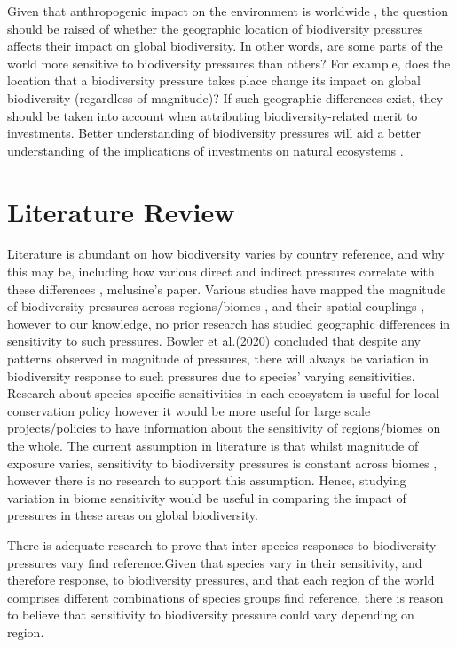\documentclass[11pt, a4paper, titlepage]{article}
\begin{document}
   	 Given that anthropogenic impact on the environment is worldwide \cite{plumptre2021might}, the question should be raised of whether the geographic location of biodiversity pressures affects their impact on global biodiversity. In other words, are some parts of the world more sensitive to biodiversity pressures than others? For example, does the location that a biodiversity pressure takes place change its impact on global biodiversity (regardless of magnitude)? If such geographic differences exist, they should be taken into account when attributing biodiversity-related merit to investments. Better understanding of biodiversity pressures will aid a better understanding of the implications of investments on natural ecosystems . \newline
   	
   	\newpage
   	\section*{Literature Review}
   	Literature is abundant on how biodiversity varies by country {reference}, and why this may be, including how various direct and indirect pressures correlate with these differences \cite{sunday2015species}, \cite{ament2019compatibility} {melusine's paper}. 
	Various studies have mapped the magnitude of biodiversity pressures across regions/biomes \newline \cite{millennium2005ecosystems} \cite{sala2000global}, and their spatial couplings \cite{bowler2020mapping}, however to our knowledge, no prior research has studied geographic differences in sensitivity to such pressures. Bowler et al.(2020) concluded that despite any patterns observed in magnitude of pressures, there will always be variation in biodiversity response to such pressures due to species' varying sensitivities. Research about species-specific sensitivities in each ecosystem is useful for local conservation policy however it would be more useful for large scale projects/policies to have information about the sensitivity of regions/biomes on the whole. The current assumption in literature is that whilst magnitude of exposure varies, sensitivity to biodiversity pressures is constant across biomes \cite{sala2000global}, however there is no research to support this assumption. Hence, studying variation in biome sensitivity would be useful in comparing the impact of pressures in these areas on global biodiversity.  \newline
	
	There is adequate research to prove that inter-species responses to biodiversity pressures vary {find reference}.Given that species vary in their sensitivity, and therefore response, to biodiversity pressures, and that each region of the world comprises different combinations of species groups {find reference}, there is reason to believe that sensitivity to biodiversity pressure could vary depending on region. \newline
	
\end{document}
